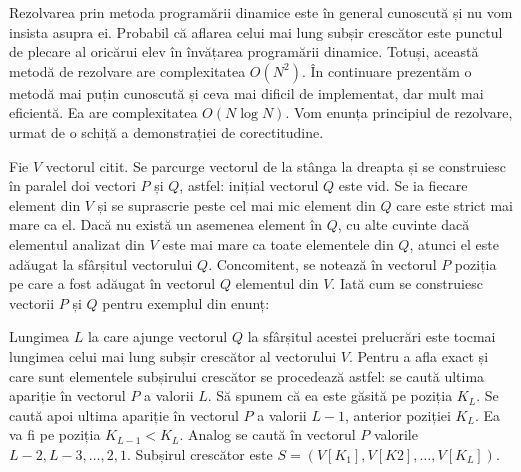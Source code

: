 Rezolvarea prin metoda programării dinamice este în general cunoscută și nu
vom insista asupra ei. Probabil că aflarea celui mai lung subșir crescător
este punctul de plecare al oricărui elev în învățarea programării
dinamice. Totuși, această metodă de rezolvare are complexitatea $O(N^2)$. În
continuare prezentăm o metodă mai puțin cunoscută și ceva mai dificil de
implementat, dar mult mai eficientă. Ea are complexitatea $O(N \log N)$. Vom
enunța principiul de rezolvare, urmat de o schiță a demonstrației de
corectitudine.

Fie $V$ vectorul citit. Se parcurge vectorul de la stânga la dreapta și se
construiesc în paralel doi vectori $P$ și $Q$, astfel: inițial vectorul $Q$
este vid. Se ia fiecare element din $V$ și se suprascrie peste cel mai mic
element din $Q$ care este strict mai mare ca el. Dacă nu există un asemenea
element în $Q$, cu alte cuvinte dacă elementul analizat din $V$ este mai mare
ca toate elementele din $Q$, atunci el este adăugat la sfârșitul vectorului
$Q$. Concomitent, se notează în vectorul $P$ poziția pe care a fost adăugat în
vectorul $Q$ elementul din $V$. Iată cum se construiesc vectorii $P$ și $Q$
pentru exemplul din enunț:


Lungimea $L$ la care ajunge vectorul $Q$ la sfârșitul acestei prelucrări este
tocmai lungimea celui mai lung subșir crescător al vectorului $V$. Pentru a
afla exact și care sunt elementele subșirului crescător se procedează astfel:
se caută ultima apariție în vectorul $P$ a valorii $L$. Să spunem că ea este
găsită pe poziția $K_L$. Se caută apoi ultima apariție în vectorul $P$ a
valorii $L-1$, anterior poziției $K_L$. Ea va fi pe poziția $K_{L-1} <
K_{L}$. Analog se caută în vectorul $P$ valorile $L-2, L-3, \dots, 2,
1$. Subșirul crescător este $S=(V[K_1], V[K2], \dots, V[K_L])$.

